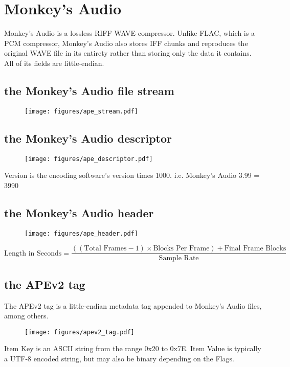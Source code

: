 \chapter{Monkey's Audio}
Monkey's Audio is a lossless RIFF WAVE compressor.
Unlike FLAC, which is a PCM compressor, Monkey's Audio also stores
IFF chunks and reproduces the original WAVE file in its entirety rather
than storing only the data it contains.
All of its fields are little-endian.

\section{the Monkey's Audio file stream}
\begin{figure}[h]
\texttt{[image: figures/ape\_stream.pdf]}
\end{figure}

\section{the Monkey's Audio descriptor}
\begin{figure}[h]
\texttt{[image: figures/ape\_descriptor.pdf]}
\end{figure}
\par
\noindent
Version is the encoding software's version times 1000.
i.e. Monkey's Audio 3.99 = 3990

\section{the Monkey's Audio header}
\begin{figure}[h]
\texttt{[image: figures/ape\_header.pdf]}
\end{figure}
{
\begin{equation}
\text{Length in Seconds} = \frac{((\text{Total Frames} - 1) \times \text{Blocks Per Frame}) + \text{Final Frame Blocks}}{\text{Sample Rate}}
\end{equation}
}
\section{the APEv2 tag}
\label{apev2}
The APEv2 tag is a little-endian metadata tag appended to
Monkey's Audio files, among others.
\begin{figure}[h]
\texttt{[image: figures/apev2\_tag.pdf]}
\end{figure}
\par
\noindent
Item Key is an ASCII string from the range 0x20 to 0x7E.
Item Value is typically a UTF-8 encoded string, but may
also be binary depending on the Flags.

